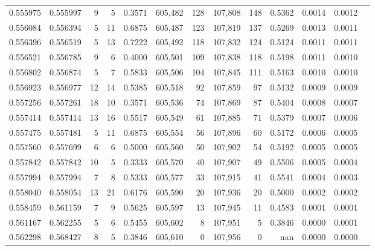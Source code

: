 \begin{tabular}{rrrrrrrrrrrrr}
0.555975 & 0.555997 &     9 &     5 &                                     0.3571 & 605,482 &     128 & 107,808 &     148 & 0.5362 & 0.0014 & 0.0012 \\
0.556084 & 0.556394 &     5 &    11 &                                     0.6875 & 605,487 &     123 & 107,819 &     137 & 0.5269 & 0.0013 & 0.0011 \\
0.556396 & 0.556519 &     5 &    13 &                                     0.7222 & 605,492 &     118 & 107,832 &     124 & 0.5124 & 0.0011 & 0.0011 \\
0.556521 & 0.556785 &     9 &     6 &                                     0.4000 & 605,501 &     109 & 107,838 &     118 & 0.5198 & 0.0011 & 0.0010 \\
0.556802 & 0.556874 &     5 &     7 &                                     0.5833 & 605,506 &     104 & 107,845 &     111 & 0.5163 & 0.0010 & 0.0010 \\
0.556923 & 0.556977 &    12 &    14 &                                     0.5385 & 605,518 &      92 & 107,859 &      97 & 0.5132 & 0.0009 & 0.0009 \\
0.557256 & 0.557261 &    18 &    10 &                                     0.3571 & 605,536 &      74 & 107,869 &      87 & 0.5404 & 0.0008 & 0.0007 \\
0.557414 & 0.557414 &    13 &    16 &                                     0.5517 & 605,549 &      61 & 107,885 &      71 & 0.5379 & 0.0007 & 0.0006 \\
0.557475 & 0.557481 &     5 &    11 &                                     0.6875 & 605,554 &      56 & 107,896 &      60 & 0.5172 & 0.0006 & 0.0005 \\
0.557560 & 0.557699 &     6 &     6 &                                     0.5000 & 605,560 &      50 & 107,902 &      54 & 0.5192 & 0.0005 & 0.0005 \\
0.557842 & 0.557842 &    10 &     5 &                                     0.3333 & 605,570 &      40 & 107,907 &      49 & 0.5506 & 0.0005 & 0.0004 \\
0.557994 & 0.557994 &     7 &     8 &                                     0.5333 & 605,577 &      33 & 107,915 &      41 & 0.5541 & 0.0004 & 0.0003 \\
0.558040 & 0.558054 &    13 &    21 &                                     0.6176 & 605,590 &      20 & 107,936 &      20 & 0.5000 & 0.0002 & 0.0002 \\
0.558459 & 0.561159 &     7 &     9 &                                     0.5625 & 605,597 &      13 & 107,945 &      11 & 0.4583 & 0.0001 & 0.0001 \\
0.561167 & 0.562255 &     5 &     6 &                                     0.5455 & 605,602 &       8 & 107,951 &       5 & 0.3846 & 0.0000 & 0.0001 \\
0.562298 & 0.568427 &     8 &     5 &                                     0.3846 & 605,610 &       0 & 107,956 &       0 &    nan & 0.0000 & 0.0000 \\
\bottomrule
\end{tabular}
